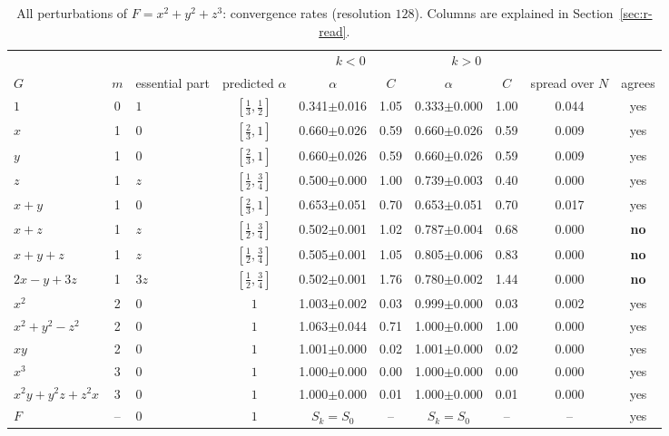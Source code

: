 \documentclass[12pt, a4paper]{article}
\theoremstyle{plain}
\theoremstyle{definition}
\theoremstyle{remark}
\theoremstyle{definition}
\begin{document}
\begin{table}[!h]
\centering
\footnotesize
\begin{adjustbox}{max width=\textwidth}
\begin{tabular}{l c l c c c c c c c}
\toprule
& & & & \multicolumn{2}{c}{$k<0$} & \multicolumn{2}{c}{$k>0$} & & \\
\cmidrule(lr){5-6}\cmidrule(lr){7-8}
$G$ & $m$ & essential part & predicted $\alpha$ & $\alpha$ & $C$ & $\alpha$ & $C$ & spread over $N$ & agrees \\
\midrule
$1$ & 0 & $1$ & $[\tfrac13,\tfrac12]$ & 0.341{\scriptsize$\pm$0.016} & 1.05 & 0.333{\scriptsize$\pm$0.000} & 1.00 & 0.044 & yes \\
$x$ & 1 & $0$ & $[\tfrac23,1]$ & 0.660{\scriptsize$\pm$0.026} & 0.59 & 0.660{\scriptsize$\pm$0.026} & 0.59 & 0.009 & yes \\
$y$ & 1 & $0$ & $[\tfrac23,1]$ & 0.660{\scriptsize$\pm$0.026} & 0.59 & 0.660{\scriptsize$\pm$0.026} & 0.59 & 0.009 & yes \\
$z$ & 1 & $z$ & $[\tfrac12,\tfrac34]$ & 0.500{\scriptsize$\pm$0.000} & 1.00 & 0.739{\scriptsize$\pm$0.003} & 0.40 & 0.000 & yes \\
$x+y$ & 1 & $0$ & $[\tfrac23,1]$ & 0.653{\scriptsize$\pm$0.051} & 0.70 & 0.653{\scriptsize$\pm$0.051} & 0.70 & 0.017 & yes \\
$x+z$ & 1 & $z$ & $[\tfrac12,\tfrac34]$ & 0.502{\scriptsize$\pm$0.001} & 1.02 & 0.787{\scriptsize$\pm$0.004} & 0.68 & 0.000 & \textbf{no} \\
$x+y+z$ & 1 & $z$ & $[\tfrac12,\tfrac34]$ & 0.505{\scriptsize$\pm$0.001} & 1.05 & 0.805{\scriptsize$\pm$0.006} & 0.83 & 0.000 & \textbf{no} \\
$2x-y+3z$ & 1 & $3z$ & $[\tfrac12,\tfrac34]$ & 0.502{\scriptsize$\pm$0.001} & 1.76 & 0.780{\scriptsize$\pm$0.002} & 1.44 & 0.000 & \textbf{no} \\
$x^2$ & 2 & $0$ & $1$ & 1.003{\scriptsize$\pm$0.002} & 0.03 & 0.999{\scriptsize$\pm$0.000} & 0.03 & 0.002 & yes \\
$x^2+y^2-z^2$ & 2 & $0$ & $1$ & 1.063{\scriptsize$\pm$0.044} & 0.71 & 1.000{\scriptsize$\pm$0.000} & 1.00 & 0.000 & yes \\
$xy$ & 2 & $0$ & $1$ & 1.001{\scriptsize$\pm$0.000} & 0.02 & 1.001{\scriptsize$\pm$0.000} & 0.02 & 0.000 & yes \\
$x^3$ & 3 & $0$ & $1$ & 1.000{\scriptsize$\pm$0.000} & 0.00 & 1.000{\scriptsize$\pm$0.000} & 0.00 & 0.000 & yes \\
$x^2y+y^2z+z^2x$ & 3 & $0$ & $1$ & 1.000{\scriptsize$\pm$0.000} & 0.01 & 1.000{\scriptsize$\pm$0.000} & 0.01 & 0.000 & yes \\
$F$ & -- & $0$ & $1$ & $S_k=S_0$ & -- & $S_k=S_0$ & -- & -- & yes \\
\bottomrule
\end{tabular}
\end{adjustbox}
\caption[Rates for $x^2+y^2+z^3$]{All perturbations of $F=x^2+y^2+z^3$: convergence rates (resolution $128$). Columns are explained in Section~\ref{sec:r-read}.}
\label{tab:r-A2a-rates}
\end{table}
\end{document}
